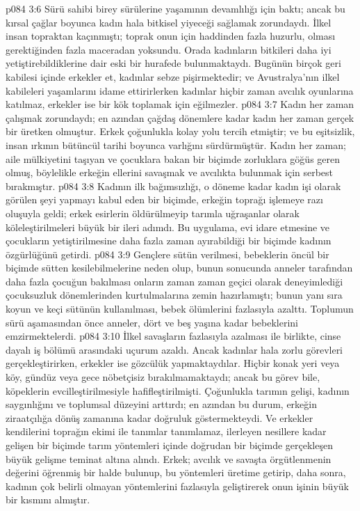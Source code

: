 \vs p084 3:6 Sürü sahibi birey sürülerine yaşamının devamlılığı için baktı; ancak bu kırsal çağlar boyunca kadın hala bitkisel yiyeceği sağlamak zorundaydı. İlkel insan topraktan kaçınmıştı; toprak onun için haddinden fazla huzurlu, olması gerektiğinden fazla maceradan yoksundu. Orada kadınların bitkileri daha iyi yetiştirebildiklerine dair eski bir hurafede bulunmaktaydı. Bugünün birçok geri kabilesi içinde erkekler et, kadınlar sebze pişirmektedir; ve Avustralya’nın ilkel kabileleri yaşamlarını idame ettirirlerken kadınlar hiçbir zaman avcılık oyunlarına katılmaz, erkekler ise bir kök toplamak için eğilmezler.
\vs p084 3:7 Kadın her zaman çalışmak zorundaydı; en azından çağdaş dönemlere kadar kadın her zaman gerçek bir üretken olmuştur. Erkek çoğunlukla kolay yolu tercih etmiştir; ve bu eşitsizlik, insan ırkının bütüncül tarihi boyunca varlığını sürdürmüştür. Kadın her zaman; aile mülkiyetini taşıyan ve çocuklara bakan bir biçimde zorluklara göğüs geren olmuş, böylelikle erkeğin ellerini savaşmak ve avcılıkta bulunmak için serbest bırakmıştır.
\vs p084 3:8 Kadının ilk bağımsızlığı, o döneme kadar kadın işi olarak görülen şeyi yapmayı kabul eden bir biçimde, erkeğin toprağı işlemeye razı oluşuyla geldi; erkek esirlerin öldürülmeyip tarımla uğraşanlar olarak köleleştirilmeleri büyük bir ileri adımdı. Bu uygulama, evi idare etmesine ve çocukların yetiştirilmesine daha fazla zaman ayırabildiği bir biçimde kadının özgürlüğünü getirdi.
\vs p084 3:9 Gençlere sütün verilmesi, bebeklerin öncül bir biçimde sütten kesilebilmelerine neden olup, bunun sonucunda anneler tarafından daha fazla çocuğun bakılması onların zaman zaman geçici olarak deneyimlediği çocuksuzluk dönemlerinden kurtulmalarına zemin hazırlamıştı; bunun yanı sıra koyun ve keçi sütünün kullanılması, bebek ölümlerini fazlasıyla azalttı. Toplumun sürü aşamasından önce anneler, dört ve beş yaşına kadar bebeklerini emzirmektelerdi.
\vs p084 3:10 İlkel savaşların fazlasıyla azalması ile birlikte, cinse dayalı iş bölümü arasındaki uçurum azaldı. Ancak kadınlar hala zorlu görevleri gerçekleştirirken, erkekler ise gözcülük yapmaktaydılar. Hiçbir konak yeri veya köy, gündüz veya gece nöbetçisiz bırakılmamaktaydı; ancak bu görev bile, köpeklerin evcilleştirilmesiyle hafifleştirilmişti. Çoğunlukla tarımın gelişi, kadının saygınlığını ve toplumsal düzeyini arttırdı; en azından bu durum, erkeğin ziraatçılığa dönüş zamanına kadar doğruluk göstermekteydi. Ve erkekler kendilerini toprağın ekimi ile tanımlar tanımlamaz, ilerleyen nesillere kadar gelişen bir biçimde tarım yöntemleri içinde doğrudan bir biçimde gerçekleşen büyük gelişme teminat altına alındı. Erkek; avcılık ve savaşta örgütlenmenin değerini öğrenmiş bir halde bulunup, bu yöntemleri üretime getirip, daha sonra, kadının çok belirli olmayan yöntemlerini fazlasıyla geliştirerek onun işinin büyük bir kısmını almıştır.

